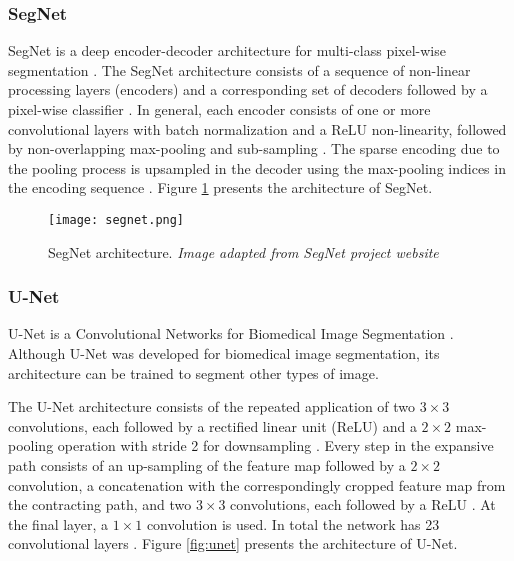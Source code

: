 \documentclass[10pt,twocolumn,letterpaper]{article}
\begin{document}
\subsubsection{SegNet} \label{sssec:segnet}

SegNet is a deep encoder-decoder architecture for multi-class pixel-wise segmentation \cite{SEGNET}. The SegNet architecture consists of a sequence of non-linear processing layers (encoders) and a corresponding set of decoders followed by a pixel-wise classifier \cite{SEGNET} \cite{SEGNET_WEBSITE}. In general, each encoder consists of one or more convolutional layers with batch normalization and a ReLU non-linearity, followed by non-overlapping max-pooling and sub-sampling \cite{SEGNET} \cite{SEGNET_WEBSITE}. The sparse encoding due to the pooling process is upsampled in the decoder using the max-pooling indices in the encoding sequence \cite{SEGNET} \cite{SEGNET_WEBSITE}. Figure \ref{fig:segnet} presents the architecture of SegNet.

\begin{figure}[ht]
  \centering
  \texttt{[image: segnet.png]}
  \caption{SegNet architecture. \textit{Image adapted from SegNet project website} \cite{SEGNET_WEBSITE} \cite{SEGNET}}
  \label{fig:segnet}
\end{figure}

\subsubsection{U-Net} \label{sssec:unet}

U-Net is a Convolutional Networks for Biomedical Image Segmentation \cite{UNET} \cite{UNET_WEBSITE}. Although U-Net was developed for biomedical image segmentation, its architecture can be trained to segment other types of image.

The U-Net architecture consists of the repeated application of two $3 \times 3$ convolutions, each followed by a rectified linear unit (ReLU) and a $2 \times 2$ max-pooling operation with stride 2 for downsampling \cite{UNET}. Every step in the expansive path consists of an up-sampling of the feature map followed by a $2 \times 2$ convolution, a concatenation with the correspondingly cropped feature map from the contracting path, and two $3 \times 3$ convolutions, each followed by a ReLU \cite{UNET}. At the final layer, a $1 \times 1$ convolution is used. In total the network has 23 convolutional layers \cite{UNET}. Figure \ref{fig:unet} presents the architecture of U-Net.
\end{document}
